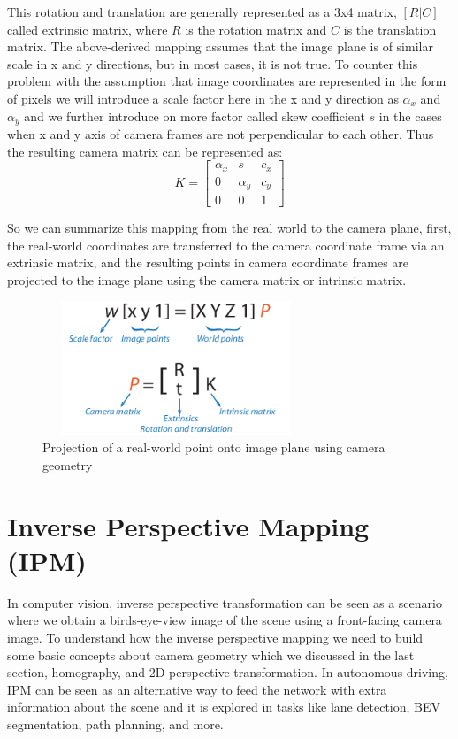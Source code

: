     This rotation and translation are generally represented as a 3x4 matrix, $[R | C ]$ called extrinsic matrix, where $R$ is the rotation matrix and $C$ is the translation matrix. The above-derived mapping assumes that the image plane is of similar scale in x and y directions, but in most cases, it is not true. To counter this problem with the assumption that image coordinates are represented in the form of pixels we will introduce a scale factor here in the x and y direction as $\alpha_{x}$ and $\alpha_{y}$ and we further introduce on more factor called skew coefficient $s$ in the cases when x and y axis of camera frames are not perpendicular to each other. Thus the resulting camera matrix can be represented as:
        \begin{equation}
K =  \begin{bmatrix} \alpha_{x} & s &c_{x} \\  0 & \alpha_{y} & c_{y}  \\  0  &0 &1 \end{bmatrix}
    \end{equation}
    
    So we can summarize this mapping from the real world to the camera plane, first, the real-world coordinates are transferred to the camera coordinate frame via an extrinsic matrix, and the resulting points in camera coordinate frames are projected to the image plane using the camera matrix or intrinsic matrix. 
        \begin{figure}[h]
    \centering
    \includegraphics[width=8cm, height =4cm]{images/extrinsic_intrinsic.png}
    \caption{ Projection of a real-world point onto image plane using camera geometry \cite{10.5555/861369}}
    \end{figure}
    
   
   
    \section{Inverse Perspective Mapping (IPM)}
     In computer vision, inverse perspective transformation can be seen as a scenario where we obtain a birds-eye-view image of the scene using a front-facing camera image. To understand how the inverse perspective mapping we need to build some basic concepts about camera geometry which we discussed in the last section, homography, and 2D perspective transformation. In autonomous driving, IPM can be seen as an alternative way to feed the network with extra information about the scene and it is explored in tasks like lane detection, BEV segmentation, path planning, and more. 
     
